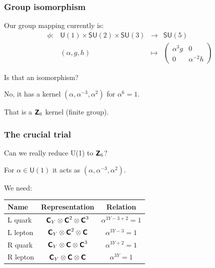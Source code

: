 \documentclass[english, fleqn]{beamer}
\begin{document}
\begin{frame}
    \frametitle{Group isomorphism}

    Our group mapping currently is:
    \[
        \begin{array}{lccc}
            \phi\colon & \mathsf{U}(1) \times \mathsf{SU}(2) \times \mathsf{SU}(3) & \to & \mathsf{SU}(5) \\
            & (\alpha, g, h) & \mapsto &
            \begin{pmatrix}
                \alpha^3 g & 0 \\
                0 & \alpha^{-2} h
            \end{pmatrix}
        \end{array}
    \]

    \pause

    Is that an isomorphism?

    No, it has a kernel $(\alpha, \alpha^{-3}, \alpha^2)$ for $\alpha^6 = 1$.

    That is a $\text{\bfseries\sffamily{Z}}_6$ kernel (finite group).
\end{frame}

\begin{frame}
    \frametitle{The crucial trial}

    Can we really reduce U(1) to $\text{\bfseries\sffamily{Z}}_6$?

    For $\alpha \in \mathsf U(1)$ it acts as $(\alpha, \alpha^{-3}, \alpha^2)$.

    We need:

    \begin{tabular}{lcc}
        \toprule
        Name & Representation & Relation \\
        \midrule
        L quark &
        $\text{\bfseries\sffamily{C}}_{Y} \otimes \text{\bfseries\sffamily{C}}^2 \otimes \text{\bfseries\sffamily{C}}^3$ &
        $\alpha^{3Y -3 +2} = 1$ \\
        L lepton &
        $\text{\bfseries\sffamily{C}}_{Y} \otimes \text{\bfseries\sffamily{C}}^2 \otimes \text{\bfseries\sffamily{C}}$ &
        $\alpha^{3Y -3} = 1$ \\
        R quark &
        $\text{\bfseries\sffamily{C}}_{Y} \otimes \text{\bfseries\sffamily{C}} \otimes \text{\bfseries\sffamily{C}}^3$ &
        $\alpha^{3Y +2} = 1$ \\
        R lepton &
        $\text{\bfseries\sffamily{C}}_{Y} \otimes \text{\bfseries\sffamily{C}} \otimes \text{\bfseries\sffamily{C}}$ &
        $\alpha^{3Y} = 1$ \\
        \bottomrule
    \end{tabular}
\end{frame}
\end{document}
